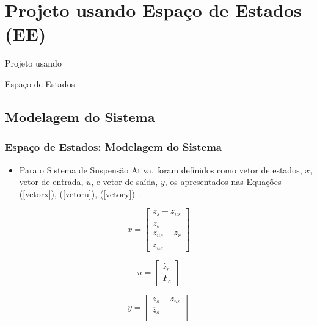 \documentclass{beamer}
\begin{document}

\section{Projeto usando Espaço de Estados (EE)}
\begin{frame}
\Huge{\centerline{Projeto usando}}
\Huge{\centerline{Espaço de Estados}}
\end{frame}
\subsection{Modelagem do Sistema}
\begin{frame}
\frametitle{Espaço de Estados: Modelagem do Sistema}
\begin{itemize}
\item Para o Sistema de Suspensão Ativa, foram definidos como vetor de estados, $x$, vetor de entrada, $u$, e vetor de saída, $y$, os apresentados nas Equações (\ref{vetorx}), (\ref{vetoru}), (\ref{vetory}) \cite{quanser}.
\end{itemize}
\begin{equation}\label{vetorx}
x=\left[ \begin{matrix}
z_s-z_{us} \\
\dot{z_s} \\
z_{us}-z_r \\
\dot{z_{us}}
\end{matrix} \right]
\end{equation}

\begin{equation}\label{vetoru}
u=\left[\begin{matrix}
\dot{z_r} \\
F_c
\end{matrix}\right]
\end{equation}

\begin{equation}\label{vetory}
y=\left[\begin{matrix}
z_s-z_{us} \\
\ddot{z_s} \\
\end{matrix}\right]
\end{equation}
\end{frame}
\end{document}
